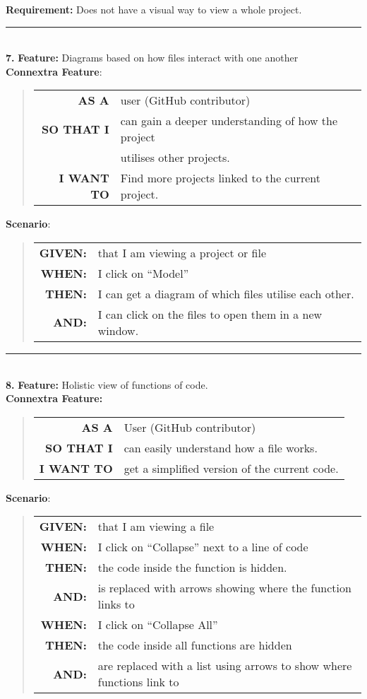 \documentclass[12pt]{article}
\newcommand{\Requirement}[1] {
   \noindent \textbf{Requirement:} #1
}
\newcommand{\Feature}[1]{ 
   \noindent \textbf{Feature:} #1
}
\newcommand{\CFeature}[4]{
\noindent \textbf{Connextra Feature:}
	\begin{quote}
	\begin{tabular}{rl}
	\textbf{AS A} & #1\\
	\textbf{SO THAT \uppercase{#2}} & #3\\
	\textbf{\uppercase{#2} WANT TO} & #4  
	\end{tabular}
	\end{quote}
}
\newcommand{\GivenSc} {
	\noindent \textbf{GIVEN:}
	}
\newcommand{\WhenSc} {
	\noindent \textbf{WHEN:}
	}
\newcommand{\AndSc} {
	\noindent \textbf{AND:}
	}
\newcommand{\ThenSc} {
	\noindent \textbf{THEN:}
	}
\begin{document}
\pagebreak
\begin{framed}
\Requirement{Does not have a visual way to view a whole project.}\\[0.2cm]

\hrule~\\

\noindent\textbf{7.}\Feature{Diagrams based on how files interact with one another}\\[0.2cm]

\noindent \textbf{Connextra Feature}:
\begin{quote}
\begin{tabular}{rl}
\textbf{AS A}      & user (\textsf{GitHub} contributor)\\
\textbf{SO THAT I} & can gain a deeper understanding of how the project\\
                   & utilises other projects.\\
\textbf{I WANT TO} & Find more projects linked to the current project.
\end{tabular}
\end{quote}

\noindent \textbf{Scenario}:
\begin{quote}
\begin{tabular}{rl}
\GivenSc & that I am viewing a project or file\\
\WhenSc & I click on “Model”\\
\ThenSc & I can get a diagram of which files utilise each other.\\
\AndSc & I can click on the files to open them in a new window.
\end{tabular}
\end{quote}

\hrule~\\

\noindent\textbf{8.}\Feature{Holistic view of functions of code.}\\[0.2cm]

\noindent \CFeature{User (\textsf{GitHub} contributor)}{I}{can easily understand how a file works.}{get a simplified version of the current code.}

\noindent \textbf{Scenario}:
\begin{quote}
\begin{tabular}{rl}
\GivenSc & that I am viewing a file\\
\WhenSc & I click on ``Collapse'' next to a line of code\\
\ThenSc & the code inside the function is hidden.\\
\AndSc & is replaced with arrows showing where the function links to\\
\WhenSc & I click on ``Collapse All''\\
\ThenSc & the code inside all functions are hidden\\
\AndSc & are replaced with a list using arrows to show where functions link to
\end{tabular}
\end{quote}
\end{framed}
\end{document}
